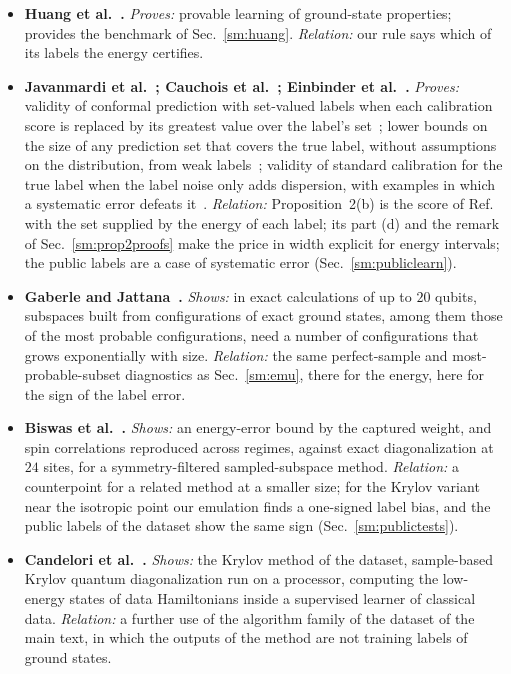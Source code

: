 \documentclass[aps,prx,onecolumn,10pt,nofootinbib,longbibliography,floatfix]{revtex4-2}
\theoremstyle{remark}
\begin{document}
\begin{itemize}
\item \textbf{Huang et al.~\cite{huang2022}.} \emph{Proves:} provable learning of ground-state properties; provides the benchmark of Sec.~\ref{sm:huang}. \emph{Relation:} our rule says which of its labels the energy certifies.
\item \textbf{Javanmardi et al.~\cite{javanmardi2023}; Cauchois et al.~\cite{cauchois2022}; Einbinder et al.~\cite{einbinder2022}.} \emph{Proves:} validity of conformal prediction with set-valued labels when each calibration score is replaced by its greatest value over the label's set~\cite{javanmardi2023}; lower bounds on the size of any prediction set that covers the true label, without assumptions on the distribution, from weak labels~\cite{cauchois2022}; validity of standard calibration for the true label when the label noise only adds dispersion, with examples in which a systematic error defeats it~\cite{einbinder2022}. \emph{Relation:} Proposition~2(b) is the score of Ref.~\cite{javanmardi2023} with the set supplied by the energy of each label; its part (d) and the remark of Sec.~\ref{sm:prop2proofs} make the price in width explicit for energy intervals; the public labels are a case of systematic error (Sec.~\ref{sm:publiclearn}). %
\item \textbf{Gaberle and Jattana~\cite{gaberle2026}.} \emph{Shows:} in exact calculations of up to $20$ qubits, subspaces built from configurations of exact ground states, among them those of the most probable configurations, need a number of configurations that grows exponentially with size. \emph{Relation:} the same perfect-sample and most-probable-subset diagnostics as Sec.~\ref{sm:emu}, there for the energy, here for the sign of the label error. %
\item \textbf{Biswas et al.~\cite{biswas2025}.} \emph{Shows:} an energy-error bound by the captured weight, and spin correlations reproduced across regimes, against exact diagonalization at $24$ sites, for a symmetry-filtered sampled-subspace method. \emph{Relation:} a counterpoint for a related method at a smaller size; for the Krylov variant near the isotropic point our emulation finds a one-signed label bias, and the public labels of the dataset show the same sign (Sec.~\ref{sm:publictests}). %
\item \textbf{Candelori et al.~\cite{candelori2026}.} \emph{Shows:} the Krylov method of the dataset, sample-based Krylov quantum diagonalization run on a processor, computing the low-energy states of data Hamiltonians inside a supervised learner of classical data. \emph{Relation:} a further use of the algorithm family of the dataset of the main text, in which the outputs of the method are not training labels of ground states.

\end{itemize}
\end{document}
